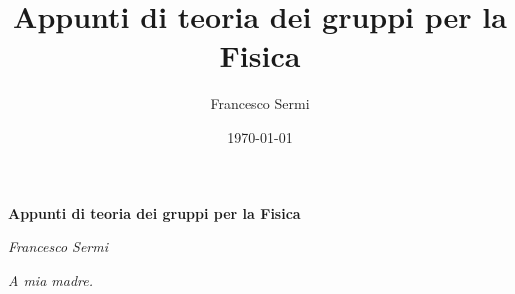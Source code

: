\documentclass[12pt, twoside, italian]{book}
\title{Appunti di teoria dei gruppi per la Fisica}
\author{Francesco Sermi}
\date{\today}
\begin{document}
	\begin{titlepage}
	\centering
	\vspace*{3cm}
	{\huge\bfseries Appunti di teoria dei gruppi per la Fisica \par}
	\vspace{2cm}
	{\Large\itshape Francesco Sermi\par}
	\vfill
	\begin{figure}[H]
		\centering
	\end{figure}




	\vfill	
	\end{titlepage}
	\pagestyle{empty}
	\cleardoublepage
	\vspace*{8cm}
	\begin{flushright}
    \begin{minipage}{0.65\textwidth}
        \itshape\small
        \noindent A mia madre. \\
    \end{minipage}
	\end{flushright}
	\cleardoublepage
	\pagestyle{fancy}
	\tableofcontents
\end{document}
